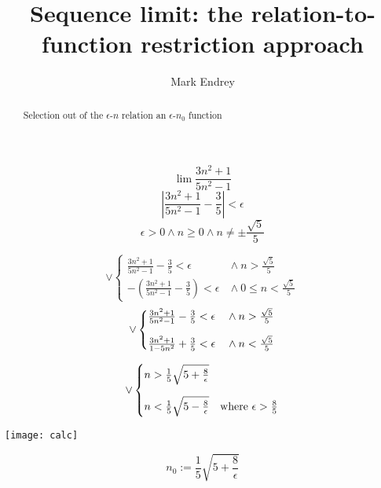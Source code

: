 \documentclass{article}
\title{Sequence limit: the relation-to-function restriction approach}
\author{Mark Endrey}
\begin{document}
	\maketitle
	\begin{abstract}
		Selection out of the $\epsilon$-$n$ relation an $\epsilon$-$n_0$ function
	\end{abstract}

	\[
		\lim \frac{3n^2+1}{5n^2-1}
	\]
	\[
		\left|\frac{3n^2+1}{5n^2-1} - \frac35\right| < \epsilon
	\]
	\[
		\epsilon > 0 \land n \geq 0 \land n \neq \pm\frac{\sqrt5}5
	\]

	\[
		\lor
		\begin{cases}
			       \frac{3n^2+1}{5n^2-1} - \frac35        < \epsilon & {} \land n > \frac{\sqrt5}5\\
			-\left(\frac{3n^2+1}{5n^2-1} - \frac35\right) < \epsilon & {} \land 0 \leq n < \frac{\sqrt5}5
		\end{cases}
	\]
	\[
		\lor
		\begin{cases}
			\frac{3n^2+1}{5n^2-1} - \frac35 < \epsilon & {} \land n > \frac{\sqrt5}5\\
			\vspace{-0.4em}\\
			\frac{3n^2+1}{1-5n^2} + \frac35 < \epsilon & {} \land n < \frac{\sqrt5}5
		\end{cases}
	\]

	\[
		\lor
		\begin{cases}
			n > \frac15\sqrt{5+\frac8\epsilon} & \\
			\vspace{-0.4em}\\
			n < \frac15\sqrt{5-\frac8\epsilon} & \text{where $\epsilon > \frac85$}
		\end{cases}
	\]

	\texttt{[image: calc]}

	\[
		n_0 := \frac15\sqrt{5+\frac8\epsilon}
	\]
\end{document}
